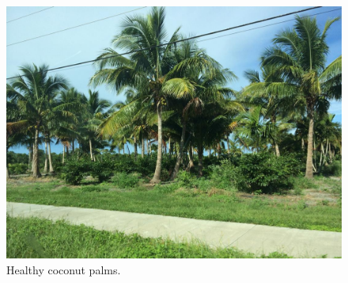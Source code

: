 \documentclass[12pt,letterpaper,english,bibliography=totocnumbered, abstract=on]{scrartcl}
\begin{document}
\begin{figure}[]
	\centering
	\includegraphics[width=0.7\linewidth]{images/healthy.jpg}
	\caption{Healthy coconut palms.}
	\label{fig:healthy}
\end{figure}


 

%
%
%	
%
%
\end{document}
